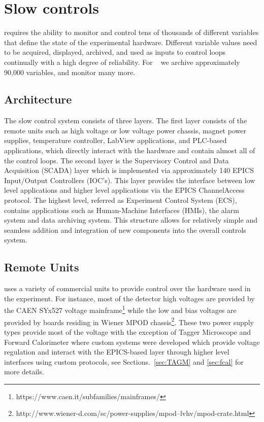 
\section[Slow controls]{Slow controls \label{sec:controls}}
\GX{} requires the ability to monitor 
and control tens of thousands of different variables that define the state of the experimental hardware. Different variable values need to be acquired, displayed, archived, and used as inputs to control loops continually with a high degree of reliability. For \gx~ we archive approximately 90,000 variables, and monitor many more.

\subsection{Architecture \label{sec:controlsarchitechture}}
The \gx{} slow control system consists of three layers. The first layer consists of the remote units such as high voltage or low voltage power chassis, magnet power supplies, temperature controller, LabView applications, and PLC-based applications, which directly interact with the hardware and contain almost all of the control loops. The second layer is the Supervisory Control and Data Acquisition (SCADA) layer which is implemented via approximately 140 EPICS Input/Output Controllers (IOC's). This layer provides the interface between low level applications and higher level applications via the EPICS ChannelAccess protocol. The highest level, referred as Experiment Control System (ECS), contains applications such as Human-Machine Interfaces (HMIs), the alarm system and data archiving system. This structure allows for relatively simple and seamless addition and integration of new components into the overall controls system.    

\subsection{Remote Units \label{sec:controlsinterface}}
\gx{} uses a variety of commercial units to provide control over the hardware used in the experiment. For instance, most of the detector high voltages are provided by the CAEN SYx527 voltage mainframe\footnote{https://www.caen.it/subfamilies/mainframes/} while the low and bias voltages are provided by boards residing in Wiener MPOD chassis\footnote{http://www.wiener-d.com/sc/power-supplies/mpod--lvhv/mpod-crate.html}. These two power supply types provide most of the voltage with the exception of Tagger Microscope and Forward Calorimeter where custom systems were developed which provide voltage regulation and interact with the EPICS-based layer through higher level interfaces using custom protocols, see Sections.~\ref{sec:TAGM} and \ref{sec:fcal} for more details.  

